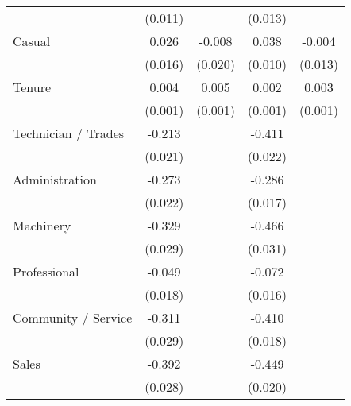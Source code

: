 {\begin{tabular}{l*{4}{c}}
                    &     (0.011)         &                     &     (0.013)         &                     \\
[1em]
Casual              &       0.026         &      -0.008         &       0.038\sym{***}&      -0.004         \\
                    &     (0.016)         &     (0.020)         &     (0.010)         &     (0.013)         \\
[1em]
Tenure              &       0.004\sym{***}&       0.005\sym{***}&       0.002\sym{***}&       0.003\sym{***}\\
                    &     (0.001)         &     (0.001)         &     (0.001)         &     (0.001)         \\
[1em]
Technician / Trades &      -0.213\sym{***}&                     &      -0.411\sym{***}&                     \\
                    &     (0.021)         &                     &     (0.022)         &                     \\
[1em]
Administration      &      -0.273\sym{***}&                     &      -0.286\sym{***}&                     \\
                    &     (0.022)         &                     &     (0.017)         &                     \\
[1em]
Machinery           &      -0.329\sym{***}&                     &      -0.466\sym{***}&                     \\
                    &     (0.029)         &                     &     (0.031)         &                     \\
[1em]
Professional        &      -0.049\sym{**} &                     &      -0.072\sym{***}&                     \\
                    &     (0.018)         &                     &     (0.016)         &                     \\
[1em]
Community / Service &      -0.311\sym{***}&                     &      -0.410\sym{***}&                     \\
                    &     (0.029)         &                     &     (0.018)         &                     \\
[1em]
Sales               &      -0.392\sym{***}&                     &      -0.449\sym{***}&                     \\
                    &     (0.028)         &                     &     (0.020)         &                     \\

\end{tabular}}
